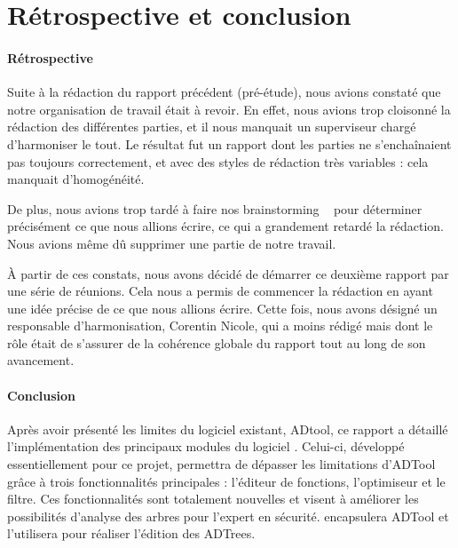 \section{Rétrospective et conclusion}
	\paragraph{Rétrospective} Suite à la rédaction du rapport précédent (pré-étude), nous avions constaté que notre organisation de travail était à revoir. En effet, nous avions trop cloisonné la rédaction des différentes parties, et il nous manquait un superviseur chargé d'harmoniser le tout. Le résultat fut un rapport dont les parties ne s'enchaînaient pas toujours correctement, et avec des styles de rédaction très variables : cela manquait d'homogénéité.

	De plus, nous avions trop tardé à faire nos \og brainstorming \fg~ pour déterminer précisément ce que nous allions écrire, ce qui a grandement retardé la rédaction. Nous avions même dû supprimer une partie de notre travail.

	À partir de ces constats, nous avons décidé de démarrer ce deuxième rapport par une série de réunions. Cela nous a permis de commencer la rédaction en ayant une idée précise de ce que nous allions écrire. Cette fois, nous avons désigné un responsable d'harmonisation, Corentin {\sc Nicole}, qui a moins rédigé mais dont le rôle était de s'assurer de la cohérence globale du rapport tout au long de son avancement.

	\paragraph{Conclusion} Après avoir présenté les limites du logiciel existant, ADtool, ce rapport a détaillé l'implémentation des principaux modules du logiciel \glasir{}. Celui-ci, développé essentiellement pour ce projet, permettra de dépasser les limitations d'ADTool grâce à trois fonctionnalités principales : l'éditeur de fonctions, l'optimiseur et le filtre. Ces fonctionnalités sont totalement nouvelles et visent à améliorer les possibilités d'analyse des arbres pour l'expert en sécurité. \glasir{} encapsulera ADTool et l'utilisera pour réaliser l'édition des ADTrees.


